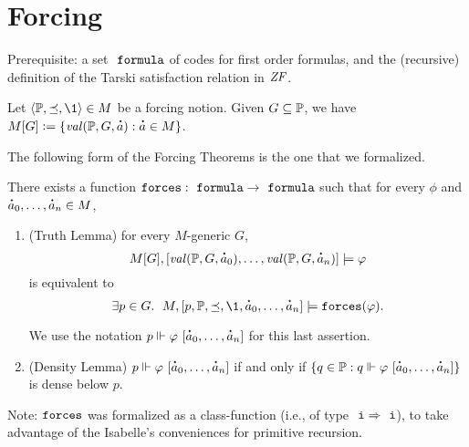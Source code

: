 \section{Forcing}
\label{sec:forcing}

Prerequisite: a set $\formula$ of codes for first order formulas, and
the (recursive) definition of the Tarski satisfaction relation in $\mathit{ZF}$. 

Let $\lb \PP, {\preceq} ,\1\rb \in M$ be a forcing notion. Given $G\subseteq \mathbb{P}$, we have
$M[G]\defi \{ \val(\PP,G,\punto{a}) : \punto{a}\in M \}$.

The following form of the Forcing Theorems  is the one
that we formalized.
\begin{theorem}
  There exists a function  $\forceisa: \formula \to  \formula$
  such that for every
  $\phi$ and $\punto{a}_0,\dots,\punto{a}_n\in M$,
  \begin{enumerate}
  \item (Truth Lemma) for every $M$-generic $G$,
    \[
      M[G], [\val(\PP,G,\punto{a}_0),\dots,\val(\PP,G,\punto{a}_n)]
      \models \phi
    \]
    is equivalent to 
    \[
      \exists p\in G.\ \; M, [p,\PP,\preceq,\1, \punto{a}_0,\dots,\punto{a}_n]  \models
      \forceisa(\phi).\]

    We use the notation $p \forces
    \phi\ [\punto{a}_0,\dots,\punto{a}_n]$ for this last assertion.
  \item (Density Lemma) $p \forces \phi\ [\punto{a}_0,\dots,\punto{a}_n]$
    if and only if 
    $\{q\in \PP :  q \forces \phi\ [\punto{a}_0,\dots,\punto{a}_n]\}$
    is dense below $p$.
  \end{enumerate}
\end{theorem}

Note: $\mathop{\mathtt{forces}}$ was formalized as a class-function (i.e., of type
$\tyi\Rightarrow\tyi$), to take advantage of the Isabelle's
conveniences for primitive recursion.

